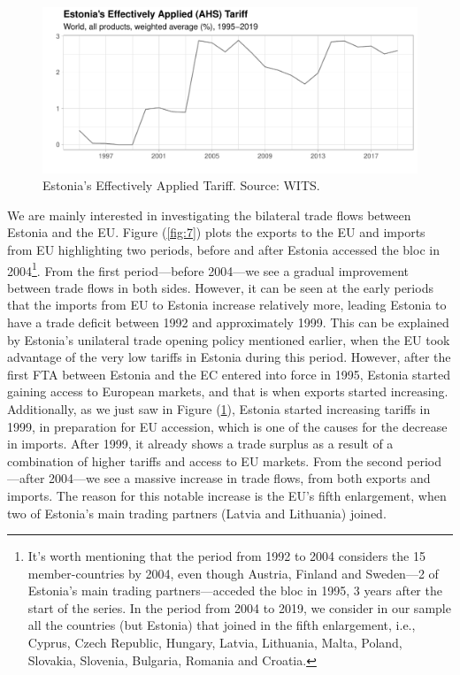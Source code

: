 \documentclass[a4paper,10pt]{article}
\begin{document}
\begin{figure}[!ht]
	\centering
	\includegraphics[width=0.75\linewidth]{EST_AHS.pdf}
	\caption{Estonia's Effectively Applied Tariff. Source: WITS.}
	\label{fig:6}
\end{figure}

We are mainly interested in investigating the bilateral trade flows between Estonia and the EU. Figure (\ref{fig:7}) plots the exports to the EU and imports from EU highlighting two periods, before and after Estonia accessed the bloc in 2004\footnote{It's worth mentioning that the period from 1992 to 2004 considers the 15 member-countries by 2004, even though Austria, Finland and Sweden---2 of Estonia's main trading partners---acceded the bloc in 1995, 3 years after the start of the series. In the period from 2004 to 2019, we consider in our sample all the countries (but Estonia) that joined in the fifth enlargement, i.e., Cyprus, Czech Republic, Hungary, Latvia, Lithuania, Malta, Poland, Slovakia, Slovenia, Bulgaria, Romania and Croatia.}. From the first period---before 2004---we see a gradual improvement between trade flows in both sides. However, it can be seen at the early periods that the imports from EU to Estonia increase relatively more, leading Estonia to have a trade deficit between 1992 and approximately 1999. This can be explained by Estonia's unilateral trade opening policy mentioned earlier, when the EU took advantage of the very low tariffs in Estonia during this period. However, after the first FTA between Estonia and the EC entered into force in 1995, Estonia started gaining access to European markets, and that is when exports started increasing. Additionally, as we just saw in Figure (\ref{fig:6}), Estonia started increasing tariffs in 1999, in preparation for EU accession, which is one of the causes for the decrease in imports. After 1999, it already shows a trade surplus as a result of a combination of higher tariffs and access to EU markets. From the second period---after 2004---we see a massive increase in trade flows, from both exports and imports. The reason for this notable increase is the EU's fifth enlargement, when two of Estonia's main trading partners (Latvia and Lithuania) joined.
\end{document}
